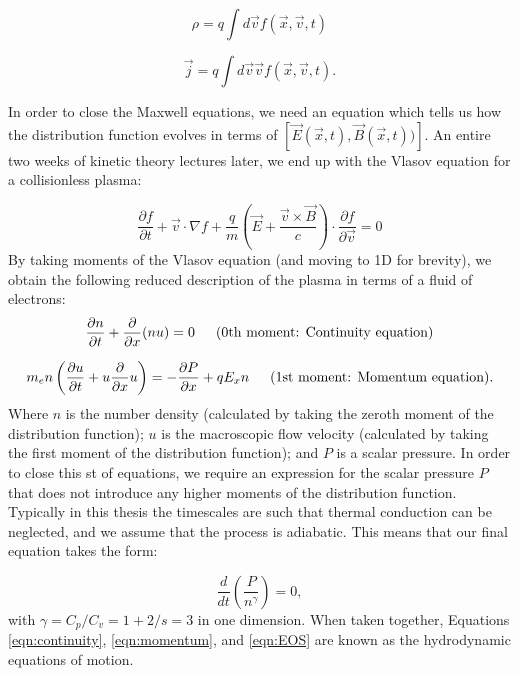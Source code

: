 \begin{equation}
\rho= q \int d \vec{v} f(\vec{x},\vec{v},t)
\end{equation}

\begin{equation}
\vec{j} = q \int d \vec{v} \vec{v} f(\vec{x},\vec{v},t).
\end{equation}

In order to close the Maxwell equations, we need an equation which tells us how the distribution function evolves in terms of $[\vec{E}(\vec{x},t),\vec{B}(\vec{x},t))]$. An entire two weeks of kinetic theory lectures later, we end up with the Vlasov equation for a collisionless plasma:

\begin{equation}
 	\frac{\partial f}{\partial t}+\vec{v} \cdot {\nabla} f+\frac{q}{m}\left(\vec{E}+\frac{\vec{v} \times \vec{B}}{c}\right) \cdot \frac{\partial f}{\partial \vec{v}}=0
\end{equation} By taking moments of the Vlasov equation (and moving to 1D for brevity), we obtain the following reduced description of the plasma in terms of a fluid of electrons: 
\begin{equation}
\frac{\partial n}{\partial t}+\frac{\partial}{\partial x}(n u)=0 \text{\,\,\,\,\,\,\,\,\,(0th moment: Continuity equation)}
\label{eqn:continuity}
\end{equation}

\begin{equation}
m_e n \left(\frac{\partial u}{\partial t} + u\frac{\partial}{\partial x}u\right)=-\frac{\partial P}{\partial x}+q E_{x} n \text{\,\,\,\,\,\,\,\,\,(1st moment: Momentum equation)}.
\label{eqn:momentum}
\end{equation} Where $n$ is the number density (calculated by taking the zeroth moment of the distribution function); $u$ is the macroscopic flow velocity (calculated by taking the first moment of the distribution function); and $P$ is a scalar pressure. In order to close this st of equations, we require an expression for the scalar pressure $P$ that does not introduce any higher moments of the distribution function. Typically in this thesis the timescales are such that thermal conduction can be neglected, and we assume that the process is adiabatic. This means that our final equation takes the form:

\begin{equation}
\frac{d}{dt}\left(\frac{P}{n^{\gamma}}\right) = 0,
\label{eqn:EOS}
\end{equation} with $\gamma = C_p/C_v = 1 + 2/s = 3$ in one dimension. When taken together, Equations \ref{eqn:continuity}, \ref{eqn:momentum}, and \ref{eqn:EOS} are known as the hydrodynamic equations of motion.

